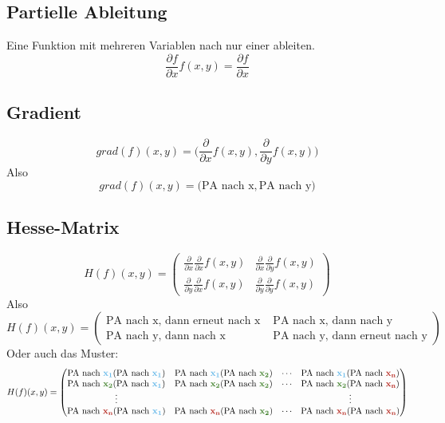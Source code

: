 \documentclass{article} %
\renewcommand{\xi}[0]{\textcolor{CornflowerBlue}{\mathbf{x_1}}}
\newcommand{\xii}[0]{\textcolor{OliveGreen}{\mathbf{x_2}}}
\newcommand{\xn}[0]{\textcolor{BrickRed}{\mathbf{x_n}}}
\begin{document}
\subsection{Partielle Ableitung} \label{subsec:partial}
Eine Funktion mit mehreren Variablen nach nur einer ableiten. 
\begin{equation}
    \frac{\partial f}{\partial x} f(x,y) =  \frac{\partial f}{\partial x}
\end{equation}
\subsection{Gradient} \label{subsec:gradient}
\begin{equation}
    grad(f)(x,y) = \Big(\frac{\partial}{\partial x} f(x,y),  \frac{\partial}{\partial y} f(x,y)\Big)
\end{equation}
Also
\begin{equation*}
    grad(f)(x,y) = \Big(\text{PA nach x},  \text{PA nach y}\Big)
\end{equation*}
\subsection{Hesse-Matrix} \label{subsec:hessematrix}
\begin{equation}
    H(f)(x,y) = \begin{pmatrix}
        \frac{\partial}{\partial x}   \frac{\partial}{\partial x} f(x,y) & \frac{\partial}{\partial x}   \frac{\partial}{\partial y} f(x,y) \\
        \frac{\partial}{\partial y}   \frac{\partial}{\partial x} f(x,y) & 
        \frac{\partial}{\partial y}   \frac{\partial}{\partial y} f(x,y)
    \end{pmatrix}
\end{equation}
Also 
\begin{equation*}
    H(f)(x,y) = \begin{pmatrix}
        \text{PA nach x, dann erneut nach x } & \text{PA nach x, dann nach y} \\
       \text{PA nach y, dann nach x}  & 
        \text{PA nach y, dann erneut nach y}
    \end{pmatrix}
\end{equation*}
Oder auch das Muster: 
\begin{equation*}
    H(f)(x,y) = \begin{pmatrix}
        \text{PA nach } \xi (\text{PA nach } \xi ) & \text{PA nach } \xi (\text{PA nach } \xii ) & \cdots & \text{PA nach } \xi (\text{PA nach } \xn ) \\
        \text{PA nach } \xii (\text{PA nach } \xi ) & \text{PA nach } \xii (\text{PA nach } \xii ) & \cdots & \text{PA nach } \xii (\text{PA nach } \xn ) \\
        \vdots & & & \vdots \\
      \text{PA nach } \xn (\text{PA nach } \xi ) & \text{PA nach } \xn (\text{PA nach } \xii ) & \cdots & \text{PA nach } \xn (\text{PA nach } \xn ) \\
    \end{pmatrix}
\end{equation*}
\end{document}
